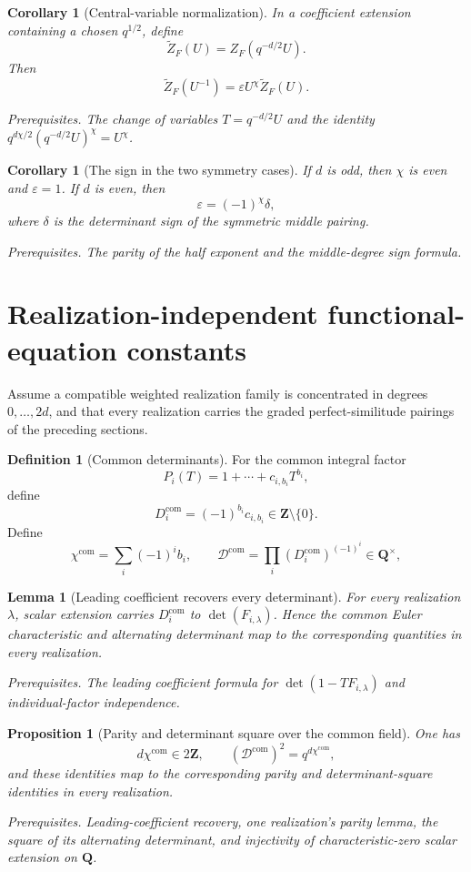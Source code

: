 \documentclass[10pt]{article}
\newtheorem{proposition}[theorem]{Proposition}
\newtheorem{corollary}[theorem]{Corollary}
\newtheorem{lemma}[theorem]{Lemma}
\theoremstyle{definition}
\newtheorem{definition}[theorem]{Definition}
\newcommand{\deps}[1]{\par\smallskip\noindent\textit{Prerequisites.} #1}
\begin{document}
\begin{corollary}[Central-variable normalization]
In a coefficient extension containing a chosen \(q^{1/2}\), define
\[
 \widetilde Z_F(U)=Z_F(q^{-d/2}U).
\]
Then
\[
 \boxed{\widetilde Z_F(U^{-1})
 =\varepsilon U^\chi\widetilde Z_F(U).}
\]
\deps{The change of variables \(T=q^{-d/2}U\) and the identity
\(q^{d\chi/2}(q^{-d/2}U)^\chi=U^\chi\).}
\end{corollary}

\begin{corollary}[The sign in the two symmetry cases]
If \(d\) is odd, then \(\chi\) is even and \(\varepsilon=1\).  If \(d\) is
even, then
\[
 \varepsilon=(-1)^\chi\delta,
\]
where \(\delta\) is the determinant sign of the symmetric middle pairing.
\deps{The parity of the half exponent and the middle-degree sign formula.}
\end{corollary}

\section{Realization-independent functional-equation constants}

Assume a compatible weighted realization family is concentrated in degrees
\(0,\ldots,2d\), and that every realization carries the graded
perfect-similitude pairings of the preceding sections.

\begin{definition}[Common determinants]
For the common integral factor
\[
 P_i(T)=1+\cdots+c_{i,b_i}T^{b_i},
\]
define
\[
 D_i^{\mathrm{com}}=(-1)^{b_i}c_{i,b_i}\in\mathbf Z\setminus\{0\}.
\]
Define
\[
 \chi^{\mathrm{com}}=\sum_i(-1)^ib_i,
 \qquad
 \mathcal D^{\mathrm{com}}
 =\prod_i(D_i^{\mathrm{com}})^{(-1)^i}\in\mathbf Q^\times,
\]
\end{definition}

\begin{lemma}[Leading coefficient recovers every determinant]
For every realization \(\lambda\), scalar extension carries
\(D_i^{\mathrm{com}}\) to
\(\det(F_{i,\lambda})\).  Hence the common Euler characteristic and
alternating determinant map to the corresponding quantities in every
realization.
\deps{The leading coefficient formula for
\(\det(1-TF_{i,\lambda})\) and individual-factor independence.}
\end{lemma}

\begin{proposition}[Parity and determinant square over the common field]
One has
\[
 d\chi^{\mathrm{com}}\in2\mathbf Z,
 \qquad
 (\mathcal D^{\mathrm{com}})^2=q^{d\chi^{\mathrm{com}}},
\]
and these identities map to the corresponding parity and determinant-square
identities in every realization.
\deps{Leading-coefficient recovery, one realization's parity lemma, the
square of its alternating determinant, and injectivity of
characteristic-zero scalar extension on \(\mathbf Q\).}
\end{proposition}
\end{document}
